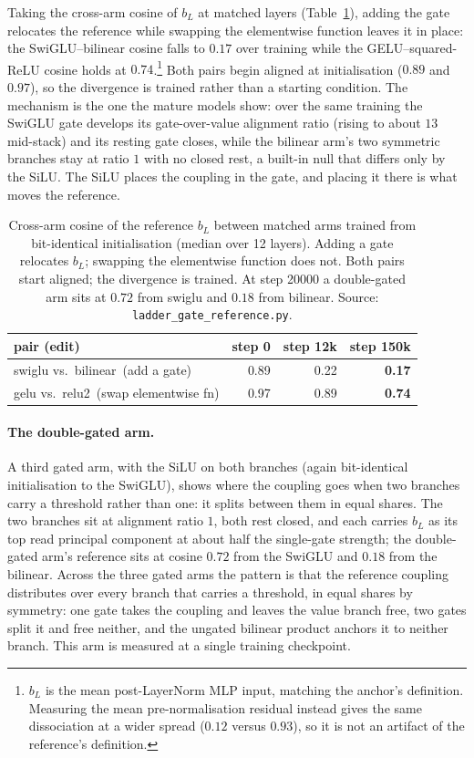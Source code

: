 \documentclass[11pt]{article}
\newcommand{\bl}{b_L}
\begin{document}
Taking the cross-arm cosine of $\bl$ at matched layers (Table~\ref{tab:reloc}),
adding the gate relocates the reference while swapping the elementwise function
leaves it in place: the SwiGLU--bilinear cosine falls to $0.17$ over training
while the GELU--squared-ReLU cosine holds at $0.74$.\footnote{$\bl$ is the mean
post-LayerNorm MLP input, matching the anchor's definition. Measuring the mean
pre-normalisation residual instead gives the same dissociation at a wider spread
($0.12$ versus $0.93$), so it is not an artifact of the reference's definition.}
Both pairs begin aligned at initialisation ($0.89$ and $0.97$), so the divergence
is trained rather than a starting condition. The mechanism is the one the mature
models show: over the same training the SwiGLU gate develops its gate-over-value
alignment ratio (rising to about $13$ mid-stack) and its resting gate closes,
while the bilinear arm's two symmetric branches stay at ratio $1$ with no closed
rest, a built-in null that differs only by the SiLU. The SiLU places the coupling
in the gate, and placing it there is what moves the reference.

\begin{table}[t]
\centering\small
\begin{tabular}{lrrr}
\toprule
pair (edit) & step 0 & step 12k & step 150k \\
\midrule
swiglu vs.\ bilinear\ (add a gate)          & 0.89 & 0.22 & \textbf{0.17} \\
gelu vs.\ relu2\ (swap elementwise fn)      & 0.97 & 0.89 & \textbf{0.74} \\
\bottomrule
\end{tabular}
\caption{Cross-arm cosine of the reference $\bl$ between matched arms trained
from bit-identical initialisation (median over 12 layers). Adding a gate
relocates $\bl$; swapping the elementwise function does not. Both pairs start
aligned; the divergence is trained. At step 20000 a double-gated arm sits at
$0.72$ from swiglu and $0.18$ from bilinear. Source:
\texttt{ladder\_gate\_reference.py}.}
\label{tab:reloc}
\end{table}

\paragraph{The double-gated arm.}
A third gated arm, with the SiLU on both branches (again bit-identical
initialisation to the SwiGLU), shows where the coupling goes when two branches
carry a threshold rather than one: it splits between them in equal shares. The
two branches sit at alignment ratio $1$, both rest closed, and each carries $\bl$
as its top read principal component at about half the single-gate strength; the
double-gated arm's reference sits at cosine $0.72$ from the SwiGLU and $0.18$ from
the bilinear. Across the three gated arms the pattern is that the reference
coupling distributes over every branch that carries a threshold, in equal shares
by symmetry: one gate takes the coupling and leaves the value branch free, two
gates split it and free neither, and the ungated bilinear product anchors it to
neither branch. This arm is measured at a single training checkpoint.
\end{document}
